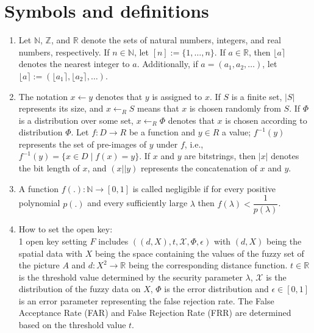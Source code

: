 \documentclass[graybox]{svmult}
\begin{document}
\section{Symbols and definitions}
\begin{enumerate}[label=(\roman*), itemsep=1em]
    \item Let \( \mathbb{N} \), \( \mathbb{Z} \), and \( \mathbb{R} \) denote the sets of natural numbers, integers, and real numbers, respectively. If \( n \in \mathbb{N} \), let \( [n] := \{1, \ldots, n\} \). If \( a \in \mathbb{R} \), then \( \lfloor a \rceil \) denotes the nearest integer to \( a \). Additionally, if \( a = (a_1, a_2, \ldots) \), let \( \lfloor a \rceil := (\lfloor a_1 \rceil, \lfloor a_2 \rceil, \ldots) \).
    \item The notation \( x \leftarrow y \) denotes that \( y \) is assigned to \( x \). If \( S \) is a finite set, \( |S| \) represents its size, and \( x \leftarrow_{{R}}   S \) means that \( x \) is chosen randomly from \( S \). If \( \varPhi \) is a distribution over some set, \( x \leftarrow_R \varPhi \) denotes that \( x \) is chosen according to distribution \( \varPhi \). Let \( f: D \rightarrow R \) be a function and \( y \in R \) a value; \( { f^{-1}(y) } \) represents the set of pre-images of \( y \) under \( f \), i.e., \( { f^{-1}(y) = \{x \in D \mid f(x) = y\} } \). If \( x \) and \( y \) are bitstrings, then \( |x| \) denotes the bit length of \( x \), and \( (x || y) \) represents the concatenation of \( x \) and \( y \).
    \item A function \( f(.): \mathbb{N} \rightarrow [0, 1] \) is called negligible if for every positive polynomial \( p(.) \) and every sufficiently large \( \lambda \) then \( f(\lambda) < \dfrac{1}{p(\lambda)} \).
    \item How to set the open key: \\
          1 open key setting \( {F} \) includes \( ((d, X), t, \mathcal{X}  , \varPhi, \epsilon) \) with \( (d, X) \) being the spatial data with \( X \) being the space containing the values of the fuzzy set of the picture \( A \) and \( d : X^2 \to \mathbb{R} \) being the corresponding distance function. \( t \in \mathbb{R} \) is the threshold value determined by the security parameter \( \lambda \), \( \mathcal{X} \) is the distribution of the fuzzy data on \( X \), \( \varPhi \) is the error distribution and \( \epsilon \in [0,1] \) is an error parameter representing the false rejection rate. The False Acceptance Rate (FAR) and False Rejection Rate (FRR) are determined based on the threshold value \( t \).\\[6pt]

\end{enumerate}
\end{document}
